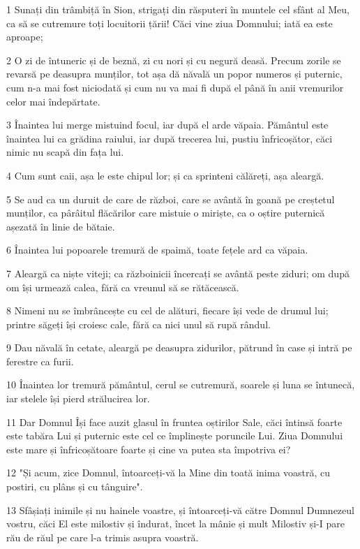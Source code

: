 \par 1 Sunați din trâmbiță în Sion, strigați din răsputeri în muntele cel sfânt al Meu, ca să se cutremure toți locuitorii țării! Căci vine ziua Domnului; iată ea este aproape;
\par 2 O zi de întuneric și de beznă, zi cu nori și cu negură deasă. Precum zorile se revarsă pe deasupra munților, tot așa dă năvală un popor numeros și puternic, cum n-a mai fost niciodată și cum nu va mai fi după el până în anii vremurilor celor mai îndepărtate.
\par 3 Înaintea lui merge mistuind focul, iar după el arde văpaia. Pământul este înaintea lui ca grădina raiului, iar după trecerea lui, pustiu înfricoșător, căci nimic nu scapă din fața lui.
\par 4 Cum sunt caii, așa le este chipul lor; și ca sprinteni călăreți, așa aleargă.
\par 5 Se aud ca un duruit de care de război, care se avântă în goană pe creștetul munților, ca pârâitul flăcărilor care mistuie o miriște, ca o oștire puternică așezată în linie de bătaie.
\par 6 Înaintea lui popoarele tremură de spaimă, toate fețele ard ca văpaia.
\par 7 Aleargă ca niște viteji; ca războinicii încercați se avântă peste ziduri; om după om își urmează calea, fără ca vreunul să se rătăcească.
\par 8 Nimeni nu se îmbrâncește cu cel de alături, fiecare își vede de drumul lui; printre săgeți își croiesc cale, fără ca nici unul să rupă rândul.
\par 9 Dau năvală în cetate, aleargă pe deasupra zidurilor, pătrund în case și intră pe ferestre ca furii.
\par 10 Înaintea lor tremură pământul, cerul se cutremură, soarele și luna se întunecă, iar stelele își pierd strălucirea lor.
\par 11 Dar Domnul Își face auzit glasul în fruntea oștirilor Sale, căci întinsă foarte este tabăra Lui și puternic este cel ce împlinește poruncile Lui. Ziua Domnului este mare și înfricoșătoare foarte și cine va putea sta împotriva ei?
\par 12 "Și acum, zice Domnul, întoarceți-vă la Mine din toată inima voastră, cu postiri, cu plâns și cu tânguire".
\par 13 Sfâșiați inimile și nu hainele voastre, și întoarceți-vă către Domnul Dumnezeul vostru, căci El este milostiv și îndurat, încet la mânie și mult Milostiv și-I pare rău de răul pe care l-a trimis asupra voastră.

